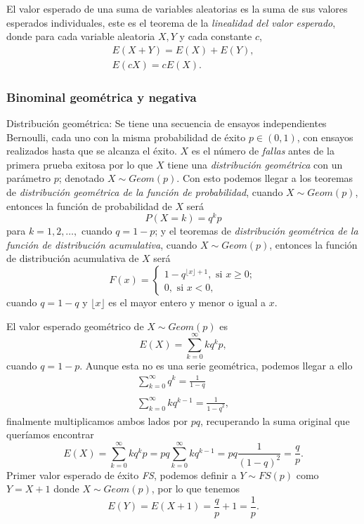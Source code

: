 \documentclass[letterpaper]{article}
\begin{document}
El valor esperado de una suma de variables aleatorias es la suma de sus valores esperados individuales, este es el teorema de la \emph{linealidad del valor esperado}, donde para cada variable aleatoria $X,Y$ y cada constante $c$,
\begin{equation}
\begin{matrix}
E(X+Y)=E(X)+E(Y),\\
E(cX)=cE(X).
\end{matrix}
\end{equation}
\subsubsection {Binominal geométrica y negativa}
Distribución geométrica: Se tiene una secuencia de ensayos independientes Bernoulli, cada uno con la misma probabilidad de éxito $p\in(0,1)$, con ensayos realizados hasta que se alcanza el éxito. $X$ es el número de \emph{fallas} antes de la primera prueba exitosa por lo que $X$ tiene una \emph{distribución geométrica} con un parámetro $p$; denotado $X\sim Geom(p)$. Con esto podemos llegar a los teoremas de \emph{distribución geométrica de la función de probabilidad}, cuando $X\sim Geom(p)$, entonces la función de probabilidad de $X$ será
\begin{equation}
P(X=k)=q^kp
\end{equation}
para $k=1,2,\ldots,$ cuando $q=1-p$; y el teoremas de \emph{distribución geométrica de la función de distribución acumulativa}, cuando $X\sim Geom(p)$, entonces la función de distribución acumulativa de $X$ será
    \begin{equation}
    F(x)=
    \begin{cases}
    1-q^{\lfloor x\rfloor+1}, \text{ si } x\geq 0;\\
    0, \text{ si }x < 0,
    \end{cases}
    \end{equation}
cuando $q=1-q$ y $\lfloor x\rfloor$ es el mayor entero y menor o igual a $x$.

El valor esperado geométrico de $X\sim Geom(p)$ es
\begin{equation}
E(X)=\sum_{k=0}^{\infty}kq^kp,
\end{equation}
cuando $q=1-p$. Aunque esta no es una serie geométrica, podemos llegar a ello
\begin{equation}\begin{matrix}
\sum_{k=0}^{\infty}q^k=\frac{1}{1-q}\\
\\
\sum_{k=0}^{\infty}kq^{k-1}=\frac{1}{{1-q}^2},
\end{matrix}
\end{equation}
finalmente multiplicamos ambos lados por $pq$, recuperando la suma original que queríamos encontrar
\begin{equation}
E(X)=\sum_{k=0}^{\infty}kq^kp=pq\sum_{k=0}^{\infty}kq^{k-1}=pq\frac{1}{{(1-q)}^2}=\frac{q}{p}.
\end{equation}
Primer valor esperado de éxito \emph{FS}, podemos definir a $Y\sim FS(p)$ como $Y=X+1$ donde $X\sim Geom(p)$, por lo que tenemos
\begin{equation}
E(Y)=E(X+1)=\frac{q}{p}+1=\frac{1}{p}.
\end{equation}
\end{document}
